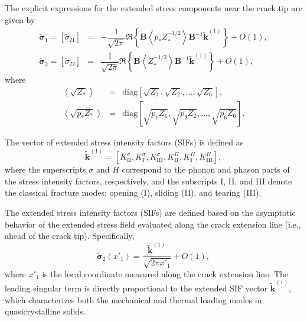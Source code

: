 The explicit expressions for the extended stress components near the
crack tip are given by \cite{Kushnir34}
\begin{equation}
	\begin{array}{rcl}
		\tilde{\boldsymbol{\sigma}}_{1}=[\tilde{\sigma}_{I1}]
		&=&
		-\dfrac{1}{\sqrt{2\pi}}
		\Re\!\left\{
		\mathbf{B}
		\left\langle p_{*}Z_{*}^{-1/2}\right\rangle
		\mathbf{B}^{-1}
		\tilde{\mathbf{k}}^{(1)}
		\right\}
		+ O(1),
		\\[1em]
		\tilde{\boldsymbol{\sigma}}_{2}=[\tilde{\sigma}_{I2}]
		&=&
		\dfrac{1}{\sqrt{2\pi}}
		\Re\!\left\{
		\mathbf{B}
		\left\langle Z_{*}^{-1/2}\right\rangle
		\mathbf{B}^{-1}
		\tilde{\mathbf{k}}^{(1)}
		\right\}
		+ O(1),
	\end{array}
	\label{KushnirEq13}
\end{equation}
%
where
\[
\begin{array}{rcl}
\left\langle \sqrt{Z_{*}} \right\rangle
&=&
\mathrm{diag}\!\left[
\sqrt{Z_{1}},\sqrt{Z_{2}},\ldots,\sqrt{Z_{6}}
\right],
\\[1em]
\left\langle \sqrt{p_{*}Z_{*}} \right\rangle
&=&
\mathrm{diag}\!\left[
\sqrt{p_{1}Z_{1}},\sqrt{p_{2}Z_{2}},\ldots,\sqrt{p_{6}Z_{6}}
\right].
\end{array}
\]

The vector of extended stress intensity factors (SIFs) is defined as
\begin{equation}
	\tilde{\mathbf{k}}^{(1)}
	=
	\left[
	K_{\mathrm{II}}^{\sigma},
	K_{\mathrm{I}}^{\sigma},
	K_{\mathrm{III}}^{\sigma},
	K_{\mathrm{II}}^{H},
	K_{\mathrm{I}}^{H},
	K_{\mathrm{III}}^{H}
	\right],
	\label{KushnirEq14}
\end{equation}
where the superscripts $\sigma$ and $H$ correspond to the phonon and
phason parts of the stress intensity factors, respectively, and the
subscripts I, II, and III denote the classical fracture modes:
opening (I), sliding (II), and tearing (III).

The extended stress intensity factors (SIFs) are defined based on the
asymptotic behavior of the extended stress field evaluated along the
crack extension line (i.e., ahead of the crack tip). Specifically,
\begin{equation}
	\tilde{\boldsymbol{\sigma}}_{2}(x'_1)
	=
	\frac{\tilde{\mathbf{k}}^{(1)}}{\sqrt{2\pi x'_1}}
	+ O(1),
	\label{KushnirEq15}
\end{equation}
where $x'_1$ is the local coordinate measured along the crack
extension line. The leading singular term is directly proportional
to the extended SIF vector $\tilde{\mathbf{k}}^{(1)}$, which
characterizes both the mechanical and thermal loading modes in
quasicrystalline solids.


